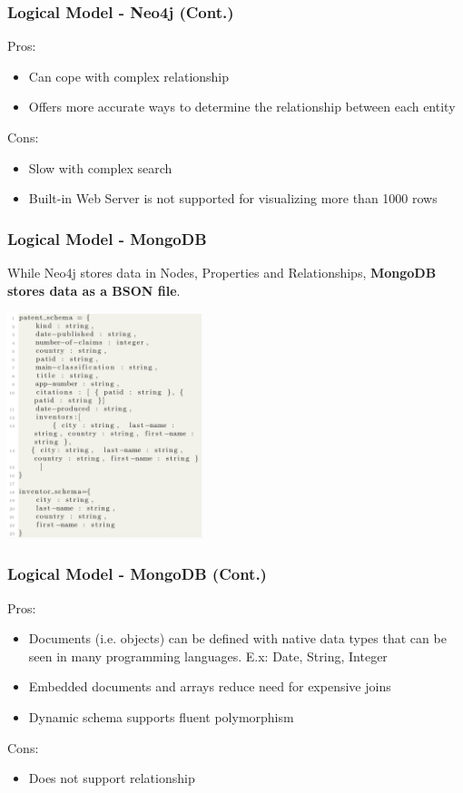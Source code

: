 \documentclass{beamer}
\begin{document}
\begin{frame}
\frametitle{Logical Model - Neo4j (Cont.)}
Pros:
\begin{itemize}
\item Can cope with complex relationship
\item Offers more accurate ways to determine the relationship between each entity
\end{itemize}
Cons:
\begin{itemize}
\item Slow with complex search
\item Built-in Web Server is not supported for visualizing more than 1000 rows
\end{itemize}
\end{frame}

\begin{frame}
\frametitle{Logical Model - MongoDB}
While Neo4j stores data in Nodes, Properties and Relationships, \textbf{MongoDB stores data as a BSON file}.
\begin{center}
\includegraphics[height=2.6in]{mongodb.png}
\end{center}
\end{frame}

\begin{frame}
\frametitle{Logical Model - MongoDB (Cont.)}
Pros:
\begin{itemize}
\item Documents (i.e. objects) can be defined with native data types that can be seen in many programming languages. E.x: Date, String, Integer
\item Embedded documents and arrays reduce need for expensive joins
\item Dynamic schema supports fluent polymorphism
\end{itemize}
Cons:
\begin{itemize}
\item Does not support relationship
\end{itemize}
\end{frame}
\end{document}
